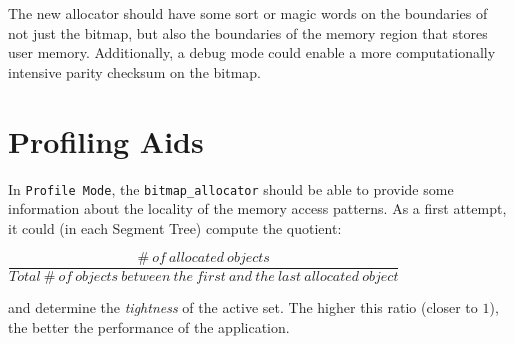 \documentclass{article}
\begin{document}
The new allocator should have some sort or magic words on the
boundaries of not just the bitmap, but also the boundaries of the
memory region that stores user memory. Additionally, a debug mode
could enable a more computationally intensive parity checksum on the
bitmap.

\section{Profiling Aids}

In \texttt{Profile Mode}, the \texttt{bitmap\_allocator} should be
able to provide some information about the locality of the memory
access patterns. As a first attempt, it could (in each Segment Tree)
compute the quotient:

$\dfrac{\#\ of\ allocated\ objects}{Total\ \#\ of\ objects\ between\ the\ first\ and\ the\ last\ allocated\ object}$

and determine the \textit{tightness} of the active set. The higher
this ratio (closer to $1$), the better the performance of the
application.
\end{document}
